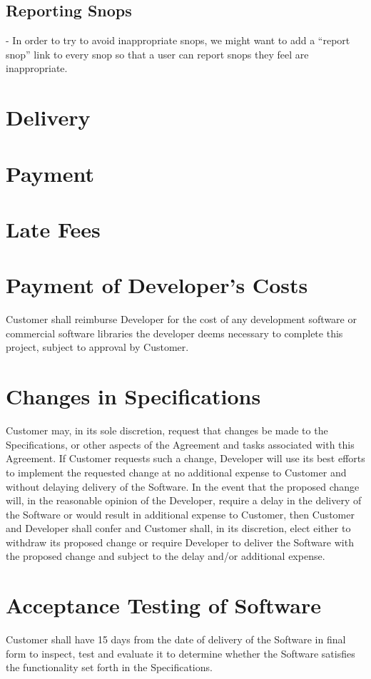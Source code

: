 \documentclass[11pt]{article}
\begin{document}
\subsection{Reporting Snops}
- In order to try to avoid inappropriate snops, we might want to add a “report snop” link to every snop so that a user can report snops they feel are inappropriate.
\section{Delivery}
\section{Payment}	
\section{Late Fees}
\section{Payment of Developer’s Costs}
Customer shall reimburse Developer for the cost of any development software or commercial software libraries the developer deems necessary to complete this project, subject to approval by Customer.
\section{Changes in Specifications}
Customer may, in its sole discretion, request that changes be made to the Specifications, or other aspects of the Agreement and tasks associated with this Agreement. If Customer requests such a change, Developer will use its best efforts to implement the requested change at no additional expense to Customer and without delaying delivery of the Software. In the event that the proposed change will, in the reasonable opinion of the Developer, require a delay in the delivery of the Software or would result in additional expense to Customer, then Customer and Developer shall confer and Customer shall, in its discretion, elect either to withdraw its proposed change or require Developer to deliver the Software with the proposed change and subject to the delay and/or additional expense.
\section{Acceptance Testing of Software}
Customer shall have 15 days from the date of delivery of the Software in final form to inspect, test and evaluate it to determine whether the Software satisfies the functionality set forth in the Specifications.
\end{document}
